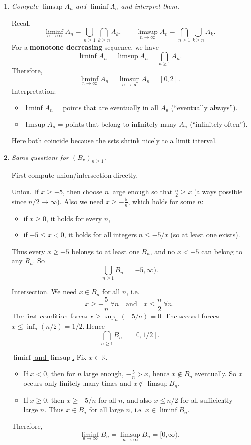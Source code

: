 \documentclass[11pt]{article}
\begin{document}
\begin{enumerate}
\begin{enumerate}[label=(\alph*)]
\item \emph{Compute $\limsup A_n$ and $\liminf A_n$ and interpret them.}

Recall
\[
\liminf_{n\to\infty}A_n=\bigcup_{n\ge1}\bigcap_{k\ge n}A_k,
\qquad
\limsup_{n\to\infty}A_n=\bigcap_{n\ge1}\bigcup_{k\ge n}A_k.
\]
For a \textbf{monotone decreasing} sequence, we have
\[
\liminf A_n=\limsup A_n=\bigcap_{n\ge1}A_n.
\]
Therefore,
\[
\liminf_{n\to\infty}A_n=\limsup_{n\to\infty}A_n=[0,2].
\]
Interpretation:
\begin{itemize}
\item $\liminf A_n$ = points that are eventually in all $A_n$ (``eventually always'').
\item $\limsup A_n$ = points that belong to infinitely many $A_n$ (``infinitely often'').
\end{itemize}
Here both coincide because the sets shrink nicely to a limit interval.

\item \emph{Same questions for $(B_n)_{n\ge1}$.}

First compute union/intersection directly.

\underline{Union.}
If $x\ge -5$, then choose $n$ large enough so that $\frac{n}{2}\ge x$ (always possible since $n/2\to\infty$).
Also we need $x\ge -\frac{5}{n}$, which holds for some $n$:
\begin{itemize}
\item if $x\ge 0$, it holds for every $n$,
\item if $-5\le x<0$, it holds for all integers $n\le -5/x$ (so at least one exists).
\end{itemize}
Thus every $x\ge -5$ belongs to at least one $B_n$, and no $x<-5$ can belong to any $B_n$.
So
\[
\bigcup_{n\ge1} B_n = [-5,\infty).
\]

\underline{Intersection.}
We need $x\in B_n$ for all $n$, i.e.
\[
x\ge -\frac{5}{n}\ \forall n
\quad\text{and}\quad
x\le \frac{n}{2}\ \forall n.
\]
The first condition forces $x\ge \sup_n(-5/n)=0$. The second forces $x\le \inf_n(n/2)=1/2$.
Hence
\[
\bigcap_{n\ge1} B_n = [0,1/2].
\]

\underline{$\liminf$ and $\limsup$.}
Fix $x\in\mathbb{R}$.
\begin{itemize}
\item If $x<0$, then for $n$ large enough, $-\frac{5}{n}>x$, hence $x\notin B_n$ eventually. So $x$ occurs only finitely many times and $x\notin \limsup B_n$.
\item If $x\ge 0$, then $x\ge -5/n$ for all $n$, and also $x\le n/2$ for all sufficiently large $n$.
Thus $x\in B_n$ for all large $n$, i.e. $x\in \liminf B_n$.
\end{itemize}
Therefore,
\[
\liminf_{n\to\infty}B_n=\limsup_{n\to\infty}B_n=[0,\infty).
\]
\end{enumerate}


\end{enumerate}
\end{document}
